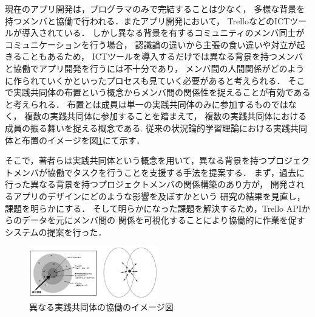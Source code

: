 
現在のアプリ開発は，プログラマのみで完結することは少なく，
多様な背景を持つメンバと協働で行われる．またアプリ開発において，
Trello\cite{trello}などのICTツールが導入されている．
しかし異なる背景を有するコミュニティのメンバ同士がコミュニケーションを行う場合，
認識論の違いから主張の食い違いや対立が起きることもあるため\cite{conflict}，
ICTツールを導入するだけでは異なる背景を持つメンバと協働でアプリ開発を行うには不十分であり，
メンバ間の人間関係がどのように作られていくかといったプロセスも見ていく必要があると考えられる．
そこで実践共同体\cite{Matsumoto}の布置という概念からメンバ間の関係性を捉えることが有効であると考えられる．
布置とは成員は単一の実践共同体のみに参加するものではなく，
複数の実践共同体に参加することを踏まえて，
複数の実践共同体における成員の振る舞いを捉える概念である.
従来の状況論的学習理論における実践共同体\cite{copImg}と布置のイメージを図\ref{cop-overlap}にて示す．

そこで，著者らは実践共同体という概念を用いて，異なる背景を持つプロジェクトメンバが協働でタスクを行うことを支援する手法を提案する．
まず，過去に行った異なる背景を持つプロジェクトメンバの関係構築のあり方が，
開発されるアプリのデザインにどのような影響を及ぼすかという
研究の結果を見直し，課題を明らかにする．
そして明らかになった課題を解決するため，Trello APIからのデータを元にメンバ間の
関係を可視化することにより協働的に作業を促すシステムの提案を行った．

\begin{figure}[h]
  \centering
  \includegraphics[width=0.5\textwidth]{img/cop-overlap.eps}
  \caption{異なる実践共同体の協働のイメージ図}
  \label{cop-overlap}
\end{figure}

